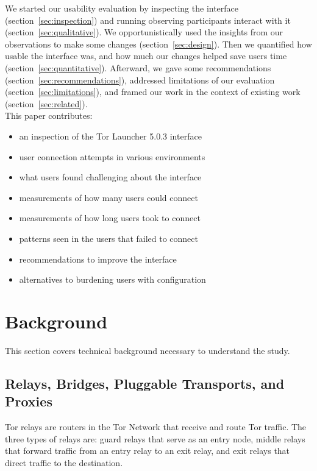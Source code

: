 \documentclass[USenglish,oneside,twocolumn]{article}
\begin{document}
We started our usability evaluation by inspecting the interface (section~\ref{sec:inspection}) and
running observing participants interact with it (section~\ref{sec:qualitative}). 
We opportunistically used the insights from our observations to make some changes (section~\ref{sec:design}).
Then we quantified how usable the interface was, and 
how much our changes helped save users time (section~\ref{sec:quantitative}).
Afterward, we gave some recommendations (section~\ref{sec:recommendations}), addressed
limitations of our evaluation (section~\ref{sec:limitations}), and framed our work in the context of existing work (section~\ref{sec:related}). \\

\noindent This paper contributes:
\smallskip
\begin{itemize}
\item an inspection of the Tor Launcher 5.0.3 interface
\item user connection attempts in various environments
\item what users found challenging about the interface
\item measurements of how many users could connect
\item measurements of how long users took to connect
\item patterns seen in the users that failed to connect
\item recommendations to improve the interface
\item alternatives to burdening users with configuration 
\end{itemize}

\section{Background}
\label{sec:background}
This section covers technical background necessary to understand the study. 

\subsection{Relays, Bridges, Pluggable Transports, and Proxies} 

Tor relays are routers in the Tor Network that receive and route Tor traffic. 
The three types of relays are: guard relays that serve as an entry node, middle relays that forward traffic from an entry relay to an exit relay, and exit relays that direct traffic to the destination. 
\end{document}
